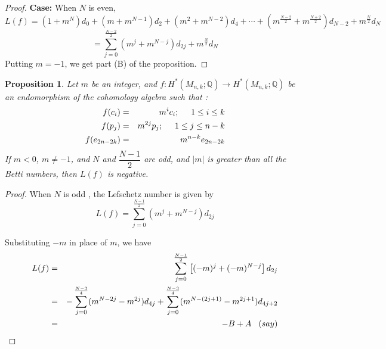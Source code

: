 \documentclass[a4paper,leqno,12pt]{amsart}
\theoremstyle{plain}
\newtheorem{prop}[thm]{Proposition}
\theoremstyle{definition}
\theoremstyle{remark}
\newcommand{\Q}{\mathbb{Q}}
\begin{document}
{\begin{proof}
\noindent
{\bf Case:} When $N$ is even,  
\begin{displaymath}
L(f) =  (1+m^{N}) d_{0} + (m + m^{N-1}) d_{2} + (m^{2} + m^{N-2}) d_{4} + \cdots +  (m^{\frac{N-2}{2}} + m^{\frac{N+2}{2}}) d_{N-2} + m^{\frac{N}{2}} d_{N}
\end{displaymath}
\begin{displaymath}
= \sum_{j=0}^{\frac{N-2}{2}} (m^{j} + m^{N-j}) d_{2j} + m^{\frac{N}{2}} d_{N}
\end{displaymath}
\noindent
Putting $m=-1$,  we get part (B) of the proposition.  
\end{proof}

\vspace{0.3cm}

\begin{prop}
Let $m$  be an integer,  and $f \colon H^{*} (M_{n,k} ; \Q) \longrightarrow H^{*} (M_{n,k} ; \Q)$ be an endomorphism of the cohomology algebra such that : 
\begin{eqnarray}
    f(c_{i}) &=& m^{i} c_{i} ; \hspace{0.5cm} 1 \leq i \leq k \nonumber \\ 
    f(p_{j}) &=& m^{2j} p_{j} ;  \hspace{0.5cm} 1 \leq j \leq n-k  \nonumber \\
    f(e_{2n-2k}) &=& m^{n-k}e_{2n-2k} \nonumber
\end{eqnarray}
If $m <0$,  $m \neq -1$,  and $N$ and $\dfrac{N-1}{2}$ are odd,  and $|m|$ is greater than all the Betti numbers,  then $L(f)$ is negative.  
\end{prop}

\begin{proof}
\noindent
  When $N$ is odd ,  the Lefschetz number is given by 
   \begin{equation}
       L(f)= \sum_{j=0}^{\frac{N-1}{2}}(m^{j}+m^{N-j})d_{2j} \nonumber
   \end{equation}
 
 \noindent
Substituting  $-m$ in place of $m$,  we have 
\begin{eqnarray}
       L(f)&=& \sum_{j=0}^{\frac{N-1}{2}}\left [(-m)^{j}+(-m)^{N-j} \right ]d_{2j}  \nonumber \\
           &=& - \sum_{j=0}^{\frac{N-3}{4}} ( m^{N-2j}-m^{2j})d_{4j}+ \sum_{j=0}^{\frac{N-3}{4}} ( m^{N-(2j+1)}-m^{2j+1})d_{4j+2}  \nonumber \\ 
           &=& -B + A  \hspace{0.3cm} (say) \nonumber
   \end{eqnarray}


\end{proof}}
\end{document}
